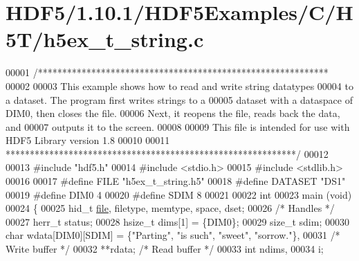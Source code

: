 \hypertarget{_h_d_f5_21_810_81_2_h_d_f5_examples_2_c_2_h5_t_2h5ex__t__string_8c_source}{}\section{H\+D\+F5/1.10.1/\+H\+D\+F5\+Examples/\+C/\+H5\+T/h5ex\+\_\+t\+\_\+string.c}
\label{_h_d_f5_21_810_81_2_h_d_f5_examples_2_c_2_h5_t_2h5ex__t__string_8c_source}

\begin{DoxyCode}
00001 \textcolor{comment}{/************************************************************}
00002 \textcolor{comment}{}
00003 \textcolor{comment}{  This example shows how to read and write string datatypes}
00004 \textcolor{comment}{  to a dataset.  The program first writes strings to a}
00005 \textcolor{comment}{  dataset with a dataspace of DIM0, then closes the file.}
00006 \textcolor{comment}{  Next, it reopens the file, reads back the data, and}
00007 \textcolor{comment}{  outputs it to the screen.}
00008 \textcolor{comment}{}
00009 \textcolor{comment}{  This file is intended for use with HDF5 Library version 1.8}
00010 \textcolor{comment}{}
00011 \textcolor{comment}{ ************************************************************/}
00012 
00013 \textcolor{preprocessor}{#include "hdf5.h"}
00014 \textcolor{preprocessor}{#include <stdio.h>}
00015 \textcolor{preprocessor}{#include <stdlib.h>}
00016 
00017 \textcolor{preprocessor}{#define FILE            "h5ex\_t\_string.h5"}
00018 \textcolor{preprocessor}{#define DATASET         "DS1"}
00019 \textcolor{preprocessor}{#define DIM0            4}
00020 \textcolor{preprocessor}{#define SDIM            8}
00021 
00022 \textcolor{keywordtype}{int}
00023 main (\textcolor{keywordtype}{void})
00024 \{
00025     hid\_t       \hyperlink{structfile}{file}, filetype, memtype, space, dset;
00026                                             \textcolor{comment}{/* Handles */}
00027     herr\_t      status;
00028     hsize\_t     dims[1] = \{DIM0\};
00029     \textcolor{keywordtype}{size\_t}      sdim;
00030     \textcolor{keywordtype}{char}        wdata[DIM0][SDIM] = \{\textcolor{stringliteral}{"Parting"}, \textcolor{stringliteral}{"is such"}, \textcolor{stringliteral}{"sweet"}, \textcolor{stringliteral}{"sorrow."}\},
00031                                             \textcolor{comment}{/* Write buffer */}
00032                 **rdata;                    \textcolor{comment}{/* Read buffer */}
00033     \textcolor{keywordtype}{int}         ndims,
00034                 i;

\end{DoxyCode}
